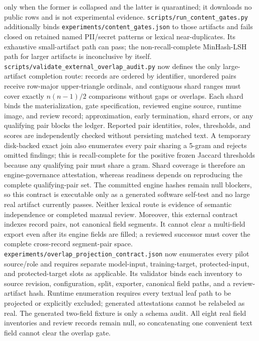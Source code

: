 \documentclass{article}
\begin{document}
only when the former is collapsed and the latter is quarantined; it downloads
no public rows and is not experimental evidence.
\texttt{scripts/run\_content\_gates.py} additionally binds
\texttt{experiments/content\_gates.json} to those artifacts and fails closed on
retained named PII/secret patterns or lexical near-duplicates. Its exhaustive
small-artifact path can pass; the non-recall-complete MinHash-LSH path for
larger artifacts is inconclusive by itself.
\texttt{scripts/validate\_external\_overlap\_audit.py} now defines the only
large-artifact completion route: records are ordered by identifier, unordered
pairs receive row-major upper-triangle ordinals, and contiguous shard ranges
must cover exactly $n(n-1)/2$ comparisons without gaps or overlaps. Each shard
binds the materialization, gate specification, reviewed engine source, runtime
image, and review record; approximation, early termination, shard errors, or
any qualifying pair blocks the ledger. Reported pair identities, roles,
thresholds, and scores are independently checked without persisting matched
text. A temporary disk-backed exact join also enumerates every pair sharing a
5-gram and rejects omitted findings; this is recall-complete for the positive
frozen Jaccard thresholds because any qualifying pair must share a gram. Shard
coverage is therefore an engine-governance attestation, whereas readiness
depends on reproducing the complete qualifying-pair set. The committed engine
hashes remain null blockers, so this contract is executable only as a generated
software self-test and no large real artifact currently passes. Neither lexical
route is evidence of semantic independence or completed manual review.
Moreover, this external contract indexes record pairs, not canonical field
segments. It cannot clear a multi-field export even after its engine fields are
filled; a reviewed successor must cover the complete cross-record segment-pair
space.
\texttt{experiments/overlap\_projection\_contract.json} now enumerates every
pilot source/role and requires separate model-input, training-target,
protected-input, and protected-target slots as applicable. Its validator binds
each inventory to source revision, configuration, split, exporter, canonical
field paths, and a review-artifact hash. Runtime enumeration requires every
textual leaf path to be projected or explicitly excluded; generated
attestations cannot be relabeled as real. The generated two-field fixture is
only a schema audit. All eight real
field inventories and review records remain null, so concatenating one
convenient text field cannot clear the overlap gate.
\end{document}
